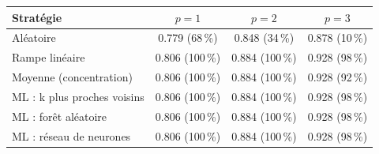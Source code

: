\begin{tabular}{lccc}
\toprule
Stratégie & $p=1$ & $p=2$ & $p=3$ \\
\midrule
Aléatoire & 0.779 (68\,\%) & 0.848 (34\,\%) & 0.878 (10\,\%) \\
Rampe linéaire & 0.806 (100\,\%) & 0.884 (100\,\%) & 0.928 (98\,\%) \\
Moyenne (concentration) & 0.806 (100\,\%) & 0.884 (100\,\%) & 0.928 (92\,\%) \\
ML : k plus proches voisins & 0.806 (100\,\%) & 0.884 (100\,\%) & 0.928 (98\,\%) \\
ML : forêt aléatoire & 0.806 (100\,\%) & 0.884 (100\,\%) & 0.928 (98\,\%) \\
ML : réseau de neurones & 0.806 (100\,\%) & 0.884 (100\,\%) & 0.928 (98\,\%) \\
\bottomrule
\end{tabular}